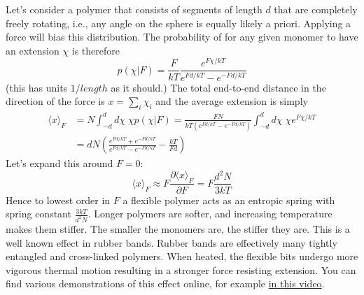 Let's consider a polymer that consists of segments of length $d$ that are completely freely rotating, i.e., any angle on the sphere is equally likely a priori.
Applying a force will bias this distribution.
The probability of for any given monomer to have an extension $\chi$ is therefore
\begin{equation}
p(\chi|F) = \frac{F}{kT}\frac{e^{F\chi/kT}}{e^{Fd/kT}-e^{-Fd/kT}}
\end{equation}
(this has units $1/length$ as it should.)
The total end-to-end distance in the direction of the force is $x=\sum_i \chi_i$ and the average extension is simply
\begin{equation}
\begin{split}
\langle x \rangle_{F} &= N\int_{-d}^d d\chi \; \chi p(\chi|F) = \frac{FN}{kT(e^{Fd/kT}-e^{-Fd/kT})} \int_{-d}^{d} d\chi \;\chi e^{F\chi/kT} \\
& = dN \left(\frac{e^{Fd/kT}+e^{-Fd/kT}}{e^{Fd/kT}-e^{-Fd/kT}} - \frac{kT}{Fd}\right)
\end{split}
\end{equation}
Let's expand this around $F=0$:
\begin{equation}
\langle x \rangle_{F} \approx F\frac{\partial \langle x \rangle_{F}}{\partial F} =  F\frac{d^2N}{3kT}
\end{equation}
Hence to lowest order in $F$ a flexible polymer acts as an entropic spring with spring constant $\frac{3kT}{d^2N}$.
Longer polymers are softer, and increasing temperature makes them stiffer. The smaller the monomers are, the stiffer they are.
This is a well known effect in rubber bands.
Rubber bands are effectively many tightly entangled and cross-linked polymers.
When heated, the flexible bits undergo more vigorous thermal motion resulting in a stronger force resisting extension.
You can find various demonstrations of this effect online, for example \href{https://www.youtube.com/watch?v=eB4B2xZI77A}{in this video}.

